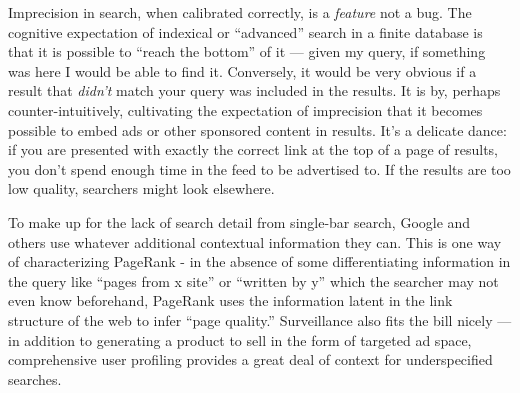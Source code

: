 Imprecision in search, when calibrated correctly, is a \emph{feature}
not a bug. The cognitive expectation of indexical or ``advanced''
search in a finite database is that it is possible to ``reach the
bottom'' of it --- given my query, if something was here I would be able
to find it. Conversely, it would be very obvious if a result that
\emph{didn't} match your query was included in the results. It is by,
perhaps counter-intuitively, cultivating the expectation of imprecision
that it becomes possible to embed ads or other sponsored content in
results. It's a delicate
dance: if you are presented with exactly the correct link at the top of
a page of results, you don't spend enough time in the feed to be
advertised to. If the results are too low quality, searchers might look
elsewhere.

To make up for the lack of search detail from single-bar search, Google
and others use whatever additional contextual information they can. This
is one way of characterizing PageRank - in the absence of some
differentiating information in the query like ``pages from x site'' or
``written by y'' which the searcher may not even know beforehand,
PageRank uses the information latent in the link structure of the web to
infer ``page quality.'' Surveillance also fits the bill nicely --- in
addition to generating a product to sell in the form of targeted ad
space, comprehensive user profiling provides a great deal of context for
underspecified searches.

